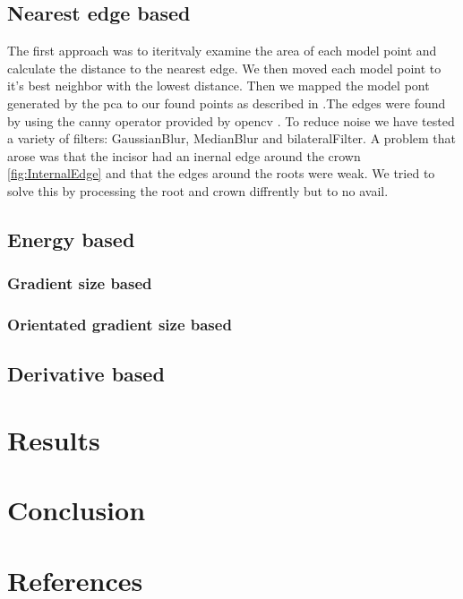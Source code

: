\documentclass[a4paper,10pt]{article}
\begin{document}
\subsection{Nearest edge based}\label{sec:fit_edge}
The first approach was to iteritvaly examine the area of each model point and calculate the distance to the nearest edge. We then moved each model point to it's best neighbor with the lowest distance. Then we mapped the model pont generated by the pca to our found points as described in \cite{GenerateModel}.The edges were found by using the canny operator provided by opencv \cite{Canny}. To reduce noise we have tested a variety of filters:  GaussianBlur, MedianBlur and bilateralFilter\cite{PythonFilters}. A problem that arose was that the incisor had an inernal edge around the crown \ref{fig:InternalEdge} and that the edges around the roots were weak. We tried to solve this by processing the root and crown diffrently but to no avail.

\subsection{Energy based}\label{sec:fit_energy}

\subsubsection{Gradient size based}


\subsubsection{Orientated gradient size based}



\subsection{Derivative based}\label{sec:fit_deriv}


\section{Results}\label{sec:results}

\section{Conclusion}


\section{References}


\end{document}

